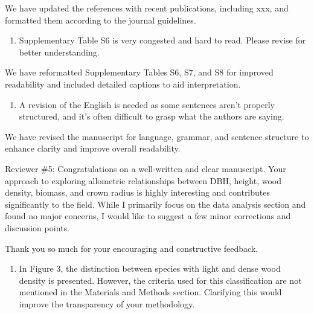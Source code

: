 \documentclass[
  12pt,
  letterpaper,
  DIV=11,
  numbers=noendperiod]{scrartcl}
\providecommand{\tightlist}{%
  \setlength{\itemsep}{0pt}\setlength{\parskip}{0pt}}\usepackage{longtable,booktabs,array}
\renewenvironment{quote}
  {\begin{customblockquote}\color{blockquote-text}\ignorespaces}
  {\end{customblockquote}}
\begin{document}
We have updated the references with recent publications, including xxx,
and formatted them according to the journal guidelines.

\begin{quote}
\begin{enumerate}
\def\labelenumi{\arabic{enumi})}
\setcounter{enumi}{7}
\tightlist
\item
  Supplementary Table S6 is very congested and hard to read. Please
  revise for better understanding.
\end{enumerate}
\end{quote}

We have reformatted Supplementary Tables S6, S7, and S8 for improved
readability and included detailed captions to aid interpretation.

\begin{quote}
\begin{enumerate}
\def\labelenumi{\arabic{enumi})}
\setcounter{enumi}{8}
\tightlist
\item
  A revision of the English is needed as some sentences aren't properly
  structured, and it's often difficult to grasp what the authors are
  saying.
\end{enumerate}
\end{quote}

We have revised the manuscript for language, grammar, and sentence
structure to enhance clarity and improve overall readability.

\begin{quote}
Reviewer \#5: Congratulations on a well-written and clear manuscript.
Your approach to exploring allometric relationships between DBH, height,
wood density, biomass, and crown radius is highly interesting and
contributes significantly to the field. While I primarily focus on the
data analysis section and found no major concerns, I would like to
suggest a few minor corrections and discussion points.
\end{quote}

Thank you so much for your encouraging and constructive feedback.

\begin{quote}
\begin{enumerate}
\def\labelenumi{\arabic{enumi})}
\tightlist
\item
  In Figure 3, the distinction between species with light and dense wood
  density is presented. However, the criteria used for this
  classification are not mentioned in the Materials and Methods section.
  Clarifying this would improve the transparency of your methodology.
\end{enumerate}
\end{quote}
\end{document}

